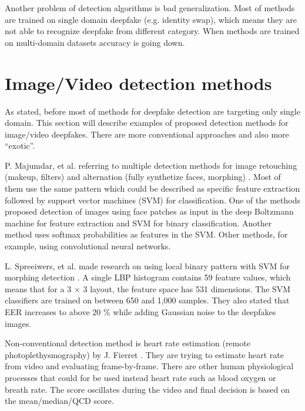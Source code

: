 Another problem of detection algorithms is bad generalization. Most of methods are trained on single domain deepfake (e.g. identity swap), which means they are not able to recognize deepfake from different category. When methods are trained on multi-domain datasets accuracy is going down. \cite{FacialRetouchingAndAlterationDetection}

\section{Image/Video detection methods}

As stated, before most of methods for deepfake detection are targeting only single domain. This section will describe examples of proposed detection methods for image/video deepfakes. There are more conventional approaches and also more “exotic”.

P. Majumdar, et al. referring to multiple detection methods for image retouching (makeup, filters) and alternation (fully synthetize faces, morphing) \cite{FacialRetouchingAndAlterationDetection}. Most of them use the same pattern which could be described as specific feature extraction followed by support vector machines (SVM) for classification. One of the methods proposed detection of images using face patches as input in the deep Boltzmann machine for feature extraction and SVM for binary classification. Another method uses softmax probabilities as features in the SVM. Other methods, for example, using convolutional neural networks. \cite{FacialRetouchingAndAlterationDetection}

L. Spreeiwers, et al. made research on using local binary pattern with SVM for morphing detection \cite{PracticalEvaluationOfFaceMorphingAttackDetectionMethods}. A single LBP histogram contains 59 feature values, which means that for a 3 × 3 layout, the feature space has 531 dimensions. The SVM classifiers are trained on between 650 and 1,000 samples. They also stated that EER increases to above 20 \% while adding Gaussian noise to the deepfakes images.

Non-conventional detection method is heart rate estimation (remote photoplethysmography) by J. Fierret \cite{DetectionBasedOnHeartRateEstimation}. They are trying to estimate heart rate from video and evaluating frame-by-frame. There are other human physiological processes that could for be used instead heart rate such as blood oxygen or breath rate. The score oscillates during the video and final decision is based on the mean/median/QCD score.

